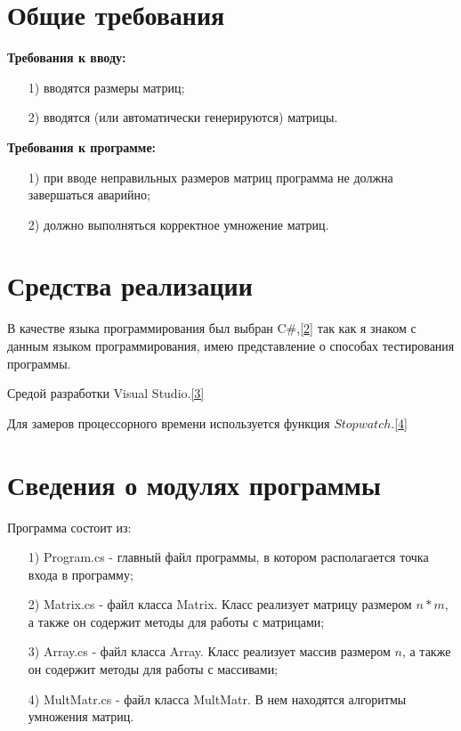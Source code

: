 \documentclass[12pt]{report}
\begin{document}
	\section{Общие требования}
	\textbf{Требования к вводу:}
	\begin{enumerate}
		\item[1)] вводятся размеры матриц;
		\item[2)] вводятся (или автоматически генерируются) матрицы.
	\end{enumerate}
	\noindent\textbf{Требования к программе:}
	\begin{enumerate}
		\item[1)] при вводе неправильных размеров матриц программа не должна завершаться аварийно;
		\item[2)] должно выполняться корректное умножение матриц.
	\end{enumerate}
	
	\section{Средства реализации}
	В качестве языка программирования был выбран C\#,\hyperref[literature]{[2]} так как я знаком с данным языком программирования, имею представление о способах тестирования программы.\par
	Средой разработки Visual Studio.\hyperref[literature]{[3]}\par 
	Для замеров процессорного времени используется функция $Stopwatch$.\hyperref[literature]{[4]}
	
	\section{Сведения о модулях программы}
	Программа состоит из:
	\begin{enumerate}
		\item[1)] Program.cs - главный файл программы, в котором располагается точка входа в программу;
		\item[2)] Matrix.cs - файл класса Matrix. Класс реализует матрицу размером $n*m$, а также он содержит методы для работы с матрицами;
		\item[3)] Array.cs - файл класса Array. Класс реализует массив размером $n$, а также он содержит методы для работы с массивами;
		\item[4)] MultMatr.cs - файл класса MultMatr. В нем находятся алгоритмы умножения матриц.
	\end{enumerate}
	
\end{document}
